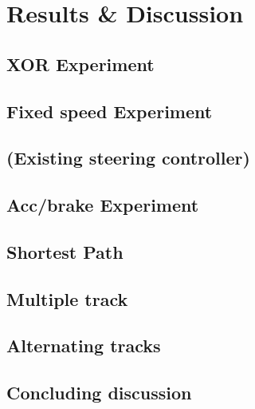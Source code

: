 \chapter{Results \& Discussion}

\section{XOR Experiment}

\section{Fixed speed Experiment}

\section{(Existing steering controller)}

\section{Acc/brake Experiment}
\section{Shortest Path}
\section{Multiple track}
\section{Alternating tracks}

\section{Concluding discussion}
%



